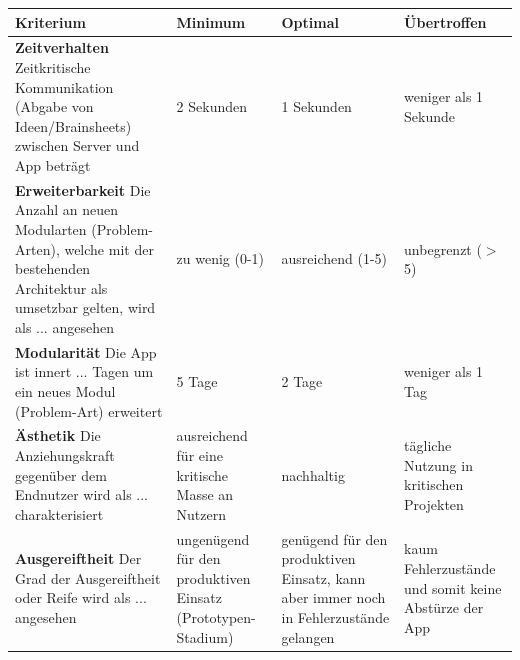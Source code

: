 \begin{center}
    \begin{tabular}{ | p{6cm} | p{2.5cm} | p{2.5cm} | p{2.5cm} |}
    	\hline
    Kriterium & Minimum & Optimal & Übertroffen \\ 
    	\hline
    \textbf{Zeitverhalten} \newline Zeitkritische Kommunikation (Abgabe von Ideen/Brainsheets) zwischen Server und App beträgt & 2 Sekunden & 1 Sekunden & weniger als 1 Sekunde \\
    	\hline
    \textbf{Erweiterbarkeit} \newline Die Anzahl an neuen Modularten (Problem-Arten), welche mit der bestehenden Architektur als umsetzbar gelten, wird als ... angesehen & zu wenig (0-1) & ausreichend (1-5) & unbegrenzt ($>$5)\\
    	\hline
    \textbf{Modularität} \newline Die App ist innert ... Tagen um ein neues Modul (Problem-Art) erweitert & 5 Tage & 2 Tage & weniger als 1 Tag \\
    	\hline
    \textbf{Ästhetik} \newline Die Anziehungskraft gegenüber dem Endnutzer wird als ... charakterisiert & ausreichend für eine kritische Masse an Nutzern & nachhaltig & tägliche Nutzung in kritischen Projekten \\
    	\hline
    \textbf{Ausgereiftheit} \newline Der Grad der Ausgereiftheit oder Reife wird als ... angesehen & ungenügend für den produktiven Einsatz (Prototypen-Stadium) & genügend für den produktiven Einsatz, kann aber immer noch in Fehlerzustände gelangen & kaum Fehlerzustände und somit keine Abstürze der App  \\
    	\hline
    \end{tabular}
\end{center}
